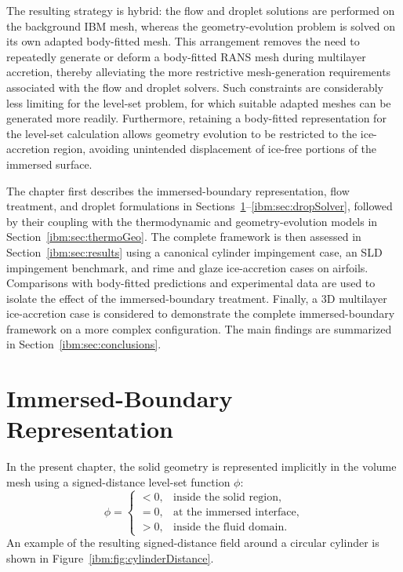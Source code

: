 The resulting strategy is hybrid: the flow and droplet solutions are performed on the background IBM mesh, whereas the geometry-evolution problem is solved on its own adapted body-fitted mesh. This arrangement removes the need to repeatedly generate or deform a body-fitted RANS mesh during multilayer accretion, thereby alleviating the more restrictive mesh-generation requirements associated with the flow and droplet solvers. Such constraints are considerably less limiting for the level-set problem, for which suitable adapted meshes can be generated more readily. Furthermore, retaining a body-fitted representation for the level-set calculation allows geometry evolution to be restricted to the ice-accretion region, avoiding unintended displacement of ice-free portions of the immersed surface.

The chapter first describes the immersed-boundary representation, flow treatment, and droplet formulations in Sections~\ref{ibm:sec:ibmRepresentation}--\ref{ibm:sec:dropSolver}, followed by their coupling with the thermodynamic and geometry-evolution models in Section~\ref{ibm:sec:thermoGeo}. The complete framework is then assessed in Section~\ref{ibm:sec:results} using a canonical cylinder impingement case, an SLD impingement benchmark, and rime and glaze ice-accretion cases on airfoils. Comparisons with body-fitted predictions and experimental data are used to isolate the effect of the immersed-boundary treatment. Finally, a 3D multilayer ice-accretion case is considered to demonstrate the complete immersed-boundary framework on a more complex configuration. The main findings are summarized in Section~\ref{ibm:sec:conclusions}.

\section{Immersed-Boundary Representation}
\label{ibm:sec:ibmRepresentation}

In the present chapter, the solid geometry is represented implicitly in the volume mesh using a signed-distance level-set function $\phi$:
\begin{equation}
\phi =
\begin{cases}
< 0, & \text{inside the solid region}, \\
= 0, & \text{at the immersed interface}, \\
> 0, & \text{inside the fluid domain}.
\end{cases}
\label{ibm:eq:levelSet}
\end{equation}
An example of the resulting signed-distance field around a circular cylinder is shown in Figure~\ref{ibm:fig:cylinderDistance}.

